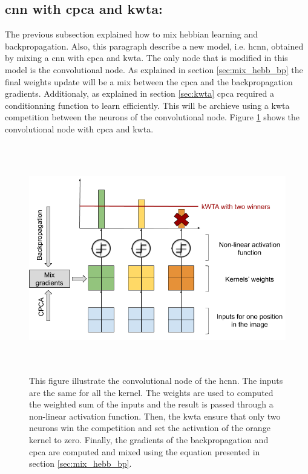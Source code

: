 \documentclass[11pt]{report}
\begin{document}
\subsection{\acrshort{cnn} with \acrshort{cpca} and \acrshort{kwta}:}
The previous subsection explained how to mix hebbian learning and backpropagation. Also, this paragraph describe a new model, i.e. \acrshort{hcnn}, obtained by mixing a \acrshort{cnn} with \acrshort{cpca} and \acrshort{kwta}. The only node that is modified in this model is the convolutional node. As explained in section \ref{sec:mix_hebb_bp} the final weights update will be a mix between the \acrshort{cpca} and the backpropagation gradients. Additionaly, as explained in section \ref{sec:kwta} \acrshort{cpca} required a conditionning function to learn efficiently. This will be archieve using a \acrshort{kwta} competition between the neurons of the convolutional node. Figure \ref{fig:hcnn} shows the convolutional node with \acrshort{cpca} and \acrshort{kwta}.

\begin{figure}[h]
\centering
\includegraphics[width=15cm, height=10cm]{hcnn}
\caption{This figure illustrate the convolutional node of the \acrlong{hcnn}. The inputs are the same for all the kernel. The weights are used to computed the weighted sum of the inputs and the result is passed through a non-linear activation function. Then, the \acrshort{kwta} ensure that only two neurons win the competition and set the activation of the orange kernel to zero. Finally, the gradients of the backpropagation and \acrshort{cpca} are computed and mixed using the equation presented in section \ref{sec:mix_hebb_bp}.}
\label{fig:hcnn}
\end{figure}
\end{document}
